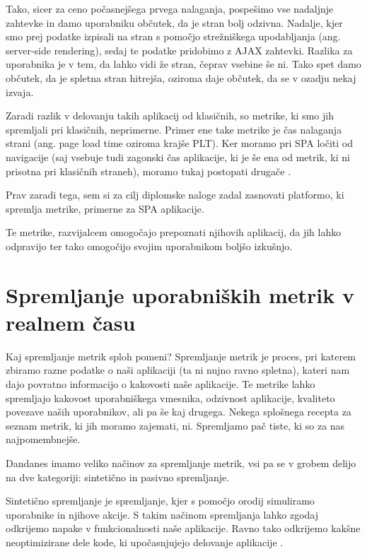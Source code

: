\documentclass[a4paper, 12pt]{book}
\begin{document}
Tako, sicer za ceno počasnejšega prvega nalaganja, pospešimo vse nadaljnje zahtevke in damo uporabniku občutek, da je stran bolj odzivna. Nadalje, kjer smo prej podatke izpisali na stran s pomočjo strežniškega upodabljanja (ang. server-side rendering), sedaj te podatke pridobimo z AJAX zahtevki. Razlika za uporabnika je v tem, da lahko vidi že stran, čeprav vsebine še ni. Tako spet damo občutek, da je spletna stran hitrejša, oziroma daje občutek, da se v ozadju nekaj izvaja.

Zaradi razlik v delovanju takih aplikacij od klasičnih, so metrike, ki smo jih spremljali pri klasičnih, neprimerne. Primer ene take metrike je čas nalaganja strani (ang. page load time oziroma krajše PLT). Ker moramo pri SPA ločiti  od  navigacije (saj  vsebuje tudi zagonski čas aplikacije, ki je še ena od metrik, ki ni prisotna pri klasičnih straneh), moramo tukaj postopati drugače \cite{hard_vs_soft_navigation}.

Prav zaradi tega, sem si za cilj diplomske naloge zadal zasnovati platformo, ki spremlja metrike, primerne za SPA aplikacije.

Te metrike, razvijalcem omogočajo prepoznati  njihovih aplikacij, da jih lahko odpravijo ter tako omogočijo svojim uporabnikom boljšo izkušnjo.



\chapter{Spremljanje uporabniških metrik v realnem času}
\label{ch0}
Kaj spremljanje metrik sploh pomeni? Spremljanje metrik je proces, pri katerem zbiramo razne podatke o naši aplikaciji (ta ni nujno ravno spletna), kateri nam dajo povratno informacijo o kakovosti naše aplikacije. Te metrike lahko spremljajo kakovost uporabniškega vmesnika, odzivnost aplikacije,  kvaliteto povezave naših uporabnikov, ali pa še kaj drugega. Nekega splošnega recepta za seznam metrik, ki jih moramo zajemati, ni. Spremljamo pač tiste, ki so za nas najpomembnejše.

Dandanes imamo veliko načinov za spremljanje metrik, vsi pa se v grobem delijo na dve kategoriji: sintetično in pasivno spremljanje.

Sintetično spremljanje je spremljanje, kjer s pomočjo orodij simuliramo uporabnike in njihove akcije. S takim načinom spremljanja lahko zgodaj odkrijemo napake v funkcionalnosti naše aplikacije. Ravno tako odkrijemo kakšne neoptimizirane dele kode, ki upočasnjujejo delovanje aplikacije \cite{what_is_rum}.
\end{document}
